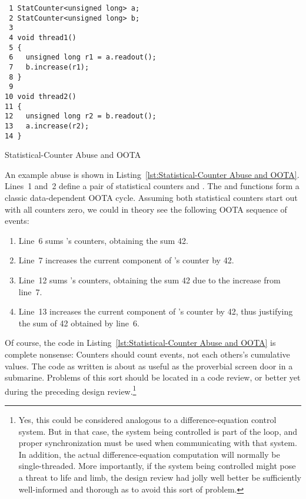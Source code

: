 \documentclass[10]{article}
\begin{document}
\begin{listing}[tbp]
\begin{verbatim}
 1 StatCounter<unsigned long> a;
 2 StatCounter<unsigned long> b;
 3
 4 void thread1()
 5 {
 6   unsigned long r1 = a.readout();
 7   b.increase(r1);
 8 }
 9
10 void thread2()
11 {
12   unsigned long r2 = b.readout();
13   a.increase(r2);
14 }
\end{verbatim}
\caption{Statistical-Counter Abuse and OOTA}
\label{lst:Statistical-Counter Abuse and OOTA}
\end{listing}

An example abuse is shown in
Listing~\ref{lst:Statistical-Counter Abuse and OOTA}.
Lines~1 and~2 define a pair of statistical counters  and .
The  and  functions form a classic
data-dependent OOTA cycle.
Assuming both statistical counters start out with all counters zero,
we could in theory see the following OOTA sequence of events:

\begin{enumerate}
\item	Line~6 sums 's counters, obtaining the sum 42.
\item	Line~7 increases the current component of 's counter by 42.
\item	Line~12 sums 's counters, obtaining the sum 42 due to the
	increase from line~7.
\item	Line~13 increases the current component of 's counter by 42,
	thus justifying the sum of 42 obtained by line~6.
\end{enumerate}

Of course, the code in
Listing~\ref{lst:Statistical-Counter Abuse and OOTA}
is complete nonsense: Counters should count events, not each others's
cumulative values.
The code as written is about as useful as the proverbial screen door in
a submarine.
Problems of this sort should be located in a code review, or better yet
during the preceding design review.\footnote{
	Yes, this could be considered analogous to a difference-equation
	control system.
	But in that case, the system being controlled is part of the
	loop, and proper synchronization must be used when communicating
	with that system.
	In addition, the actual difference-equation computation will
	normally be single-threaded.
	More importantly, if the system being controlled might pose a threat
	to life and limb, the design review had jolly well better be
	sufficiently well-informed and thorough as to avoid this sort
	of problem.}
\end{document}
